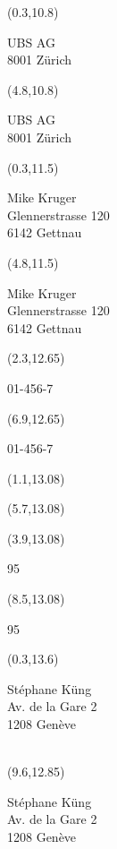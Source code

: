 \documentclass[a4paper,12pt]{letter}
\newenvironment{ocr}{\myfont}{}
\newcommand\account{01-456-7}
\newcommand\francs{168}
\newcommand\cents{95}
\newcommand\wirereceiver{UBS AG\\8001 Zürich}
\newcommand\wirefor{Mike Kruger\\Glennerstrasse 120\\6142 Gettnau}
\newcommand\wirefrom{Stéphane Küng\\Av. de la Gare 2\\1208 Genève\\}
\begin{document}
\begin{ocr}

\begin{textblock}{4.2}(0.3,10.8)
\raggedright
\wirereceiver\
\end{textblock}

\begin{textblock}{4.2}(4.8,10.8)
\raggedright
\wirereceiver\
\end{textblock}

\begin{textblock}{4.2}(0.3,11.5)
\raggedright
\wirefor\
\end{textblock}

\begin{textblock}{4.2}(4.8,11.5)
\raggedright
\wirefor\
\end{textblock}

\begin{textblock}{2.2}(2.3,12.65)
\raggedright
\account\
\end{textblock}

\begin{textblock}{2.2}(6.9,12.65)
\raggedright
\account\
\end{textblock}

\begin{textblock}{2}(1.1,13.08)
\raggedleft
\francs\
\end{textblock}

\begin{textblock}{2}(5.7,13.08)
\raggedleft
\francs\
\end{textblock}

\begin{textblock}{2}(3.9,13.08)
\raggedright
\cents\
\end{textblock}

\begin{textblock}{2}(8.5,13.08)
\raggedright
\cents\
\end{textblock}

\begin{textblock}{4}(0.3,13.6)
\raggedright
\wirefrom\
\end{textblock}

\begin{textblock}{4}(9.6,12.85)
\raggedright
\wirefrom\
\end{textblock}


\end{ocr}
\end{document}
